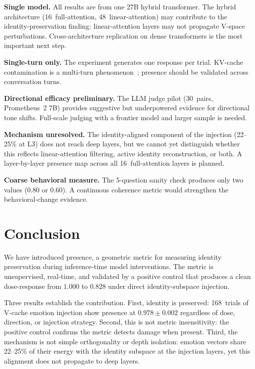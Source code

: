 \documentclass[11pt,a4paper]{article}
\begin{document}
\textbf{Single model.} All results are from one 27B hybrid transformer.
The hybrid architecture (16~full-attention, 48~linear-attention) may
contribute to the identity-preservation finding: linear-attention layers
may not propagate V-space perturbations. Cross-architecture replication on
dense transformers is the most important next step.

\textbf{Single-turn only.} The experiment generates one response per trial.
KV-cache contamination is a multi-turn
phenomenon~\citep{kang2026promptactivation}; presence should be validated
across conversation turns.

\textbf{Directional efficacy preliminary.} The LLM judge pilot (30~pairs,
Prometheus~2 7B) provides suggestive but underpowered evidence for
directional tone shifts. Full-scale judging with a frontier model and
larger sample is needed.

\textbf{Mechanism unresolved.} The identity-aligned component of the
injection (22--25\% at L3) does not reach deep layers, but we cannot yet
distinguish whether this reflects linear-attention filtering, active
identity reconstruction, or both. A layer-by-layer presence map across
all 16~full-attention layers is planned.

\textbf{Coarse behavioral measure.} The 5-question sanity check produces
only two values (0.80 or 0.60). A continuous coherence metric would
strengthen the behavioral-change evidence.

\section{Conclusion}
\label{sec:conclusion}

We have introduced presence, a geometric metric for measuring identity
preservation during inference-time model interventions. The metric is
unsupervised, real-time, and validated by a positive control that produces
a clean dose-response from $1.000$ to $0.828$ under direct
identity-subspace injection.

Three results establish the contribution. First, identity is preserved:
168~trials of V-cache emotion injection show presence at $0.978 \pm 0.002$
regardless of dose, direction, or injection strategy. Second, this is not
metric insensitivity: the positive control confirms the metric detects
damage when present. Third, the mechanism is not simple orthogonality or
depth isolation: emotion vectors share 22--25\% of their energy with the
identity subspace at the injection layers, yet this alignment does not
propagate to deep layers.
\end{document}
